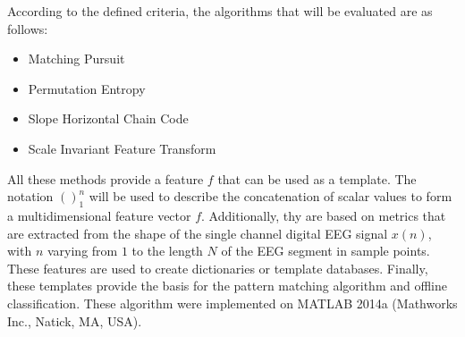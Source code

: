 \documentclass[brainsci,article,submit,moreauthors,pdftex,10pt,a4paper]{mdpi}
\begin{document}


%
%
%
%
%
%
%
%
%
%

According to the defined criteria, the algorithms that will be evaluated are as follows:

\begin{itemize}
\item Matching Pursuit
\item Permutation Entropy
\item Slope Horizontal Chain Code
\item Scale Invariant Feature Transform
\end{itemize}

All these methods provide a feature $ f $  that can be used as a template.  The notation $()_{1}^{n} $ will be used to describe the concatenation of scalar values to form a multidimensional feature vector $f$. Additionally, thy are based on metrics that are extracted from the shape of the single channel digital EEG signal $x(n)$, with $n$ varying from $1$ to the length $N$ of the EEG segment in sample points.  These features are used to create dictionaries or template databases.  Finally, these templates provide the basis for the pattern matching algorithm and offline classification. These algorithm were implemented on MATLAB 2014a (Mathworks Inc., Natick, MA, USA). 
\end{document}
